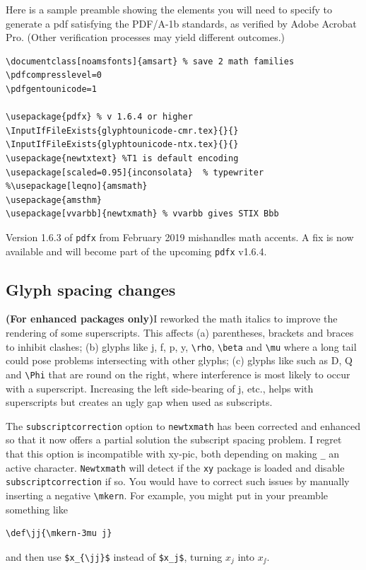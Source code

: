 \documentclass[11pt]{article}
\theoremstyle{oldplain}
\theoremstyle{plain}
\begin{document}
Here is a sample  preamble showing the elements you will need to specify to generate a pdf satisfying the PDF/A-1b standards, as verified by Adobe Acrobat Pro. (Other verification processes may yield different outcomes.)
\begin{verbatim}
\documentclass[noamsfonts]{amsart} % save 2 math families 
\pdfcompresslevel=0 
\pdfgentounicode=1 
 
\usepackage{pdfx} % v 1.6.4 or higher
\InputIfFileExists{glyphtounicode-cmr.tex}{}{} 
\InputIfFileExists{glyphtounicode-ntx.tex}{}{}
\usepackage{newtxtext} %T1 is default encoding
\usepackage[scaled=0.95]{inconsolata}  % typewriter
%\usepackage[leqno]{amsmath} 
\usepackage{amsthm}
\usepackage[vvarbb]{newtxmath} % vvarbb gives STIX Bbb
\end{verbatim}

Version 1.6.3 of {\tt pdfx} from February 2019  mishandles math accents. A fix is now available and will become part of the upcoming {\tt pdfx} v1.6.4.

\subsection{Glyph spacing changes} \textbf{(For enhanced packages only)}I reworked the math italics to improve the rendering of some  superscripts. This affects (a)  parentheses, brackets and braces to inhibit clashes; (b) glyphs like j, f, p, y, \verb|\rho|,  \verb|\beta| and  \verb|\mu| where a long tail could pose problems intersecting with other glyphs; (c) glyphs like such as D, Q and \verb|\Phi| that are round on the right, where interference is most likely to occur with a superscript. Increasing the left side-bearing of j, etc., helps with superscripts but creates an ugly gap when used as subscripts.  


 The {\tt subscriptcorrection} option to {\tt newtxmath} has been corrected and enhanced  so that it now offers a partial solution the subscript spacing problem. I regret that this option is incompatible with xy-pic, both depending on making \verb|_| an active character. {\tt Newtxmath}  will detect if the {\tt xy} package is loaded and disable {\tt subscriptcorrection} if so. You would have to correct such issues by manually inserting a negative \verb|\mkern|. For example, you might put in your preamble something like
 \begin{verbatim}
\def\jj{\mkern-3mu j}
\end{verbatim}
and then use \verb|$x_{\jj}$| instead of \verb|$x_j$|, turning $x_j$ into $x_{\jj}$.
\end{document}
